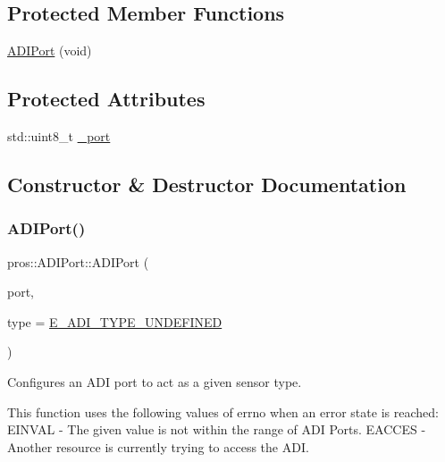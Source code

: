 \subsection*{Protected Member Functions}
\begin{DoxyCompactItemize}
\item 
\mbox{\hyperlink{classpros_1_1ADIPort_a7f44b44ce0528ea4c5ef83ed8465e72d}{A\+D\+I\+Port}} (void)
\end{DoxyCompactItemize}
\subsection*{Protected Attributes}
\begin{DoxyCompactItemize}
\item 
std\+::uint8\+\_\+t \mbox{\hyperlink{classpros_1_1ADIPort_a75f3b6c1ae3c1f6b755e18444e7559d6}{\+\_\+port}}
\end{DoxyCompactItemize}


\subsection{Constructor \& Destructor Documentation}
\mbox{\label{classpros_1_1ADIPort_ab6ef7710de366895859d770ffb1d8cf1}} 
\subsubsection{\texorpdfstring{ADIPort()}{ADIPort()}\hspace{0.1cm}{\footnotesize\ttfamily [1/2]}}
{\footnotesize\ttfamily pros\+::\+A\+D\+I\+Port\+::\+A\+D\+I\+Port (\begin{DoxyParamCaption}\item[{std\+::uint8\+\_\+t}]{port,  }\item[{\mbox{\hyperlink{adi_8h_a4efff81399e823764aa05cd5c172ea55}{adi\+\_\+port\+\_\+config\+\_\+e\+\_\+t}}}]{type = {\ttfamily \mbox{\hyperlink{adi_8h_ad5f9ddf0fd9de73c4b23fa5485144b7fa37e9d6ebc03d88c58db1904a7f2b7373}{E\+\_\+\+A\+D\+I\+\_\+\+T\+Y\+P\+E\+\_\+\+U\+N\+D\+E\+F\+I\+N\+ED}}} }\end{DoxyParamCaption})}



Configures an A\+DI port to act as a given sensor type. 

This function uses the following values of errno when an error state is reached\+: E\+I\+N\+V\+AL -\/ The given value is not within the range of A\+DI Ports. E\+A\+C\+C\+ES -\/ Another resource is currently trying to access the A\+DI.


